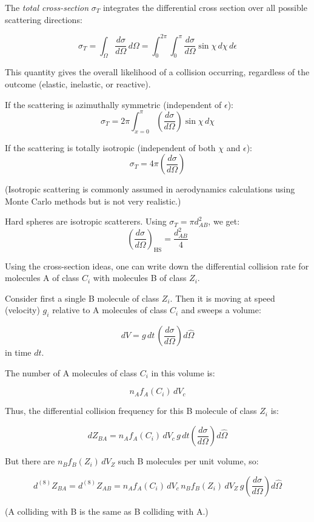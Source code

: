 \documentclass{article}
\begin{document}
The \emph{total cross-section} \( \sigma_T \) integrates the differential cross section over all possible scattering directions:

\[
\sigma_T = \int_{\Omega} \frac{d\sigma}{d\Omega} \, d\Omega = \int_0^{2\pi} \int_0^{\pi} \frac{d\sigma}{d\Omega} \sin \chi \, d\chi \, d\epsilon
\]

This quantity gives the overall likelihood of a collision occurring, regardless of the outcome (elastic, inelastic, or reactive).

If the scattering is azimuthally symmetric (independent of \( \epsilon \)):
\[
\sigma_T = 2\pi \int_{x=0}^{\pi} \left( \frac{d\sigma}{d\Omega} \right) \sin \chi \, d\chi
\]

If the scattering is totally isotropic (independent of both \( \chi \) and \( \epsilon \)):
\[
\sigma_T = 4\pi \left( \frac{d\sigma}{d\Omega} \right)
\]

(Isotropic scattering is commonly assumed in aerodynamics calculations using Monte Carlo methods but is not very realistic.)

Hard spheres are isotropic scatterers. Using \( \sigma_T = \pi d_{AB}^2 \), we get:
\[
\left( \frac{d\sigma}{d\Omega} \right)_{\text{HS}} = \frac{d_{AB}^2}{4}
\]

Using the cross-section ideas, one can write down the differential collision rate for molecules A of class \( C_i \) with molecules B of class \( Z_i \).

Consider first a single B molecule of class \( Z_i \). Then it is moving at speed (velocity) \( g_i \) relative to A molecules of class \( C_i \) and sweeps a volume:

\[
dV = g \, dt \, \left( \frac{d\sigma}{d\Omega} \right) d\hat{\Omega}
\]
in time \( dt \).

The number of A molecules of class \( C_i \) in this volume is:

\[
n_A f_A(C_i) \, dV_c
\]

Thus, the differential collision frequency for this B molecule of class \( Z_i \) is:

\[
dZ_{BA} = n_A f_A(C_i) \, dV_c \, g \, dt \left( \frac{d\sigma}{d\Omega} \right) d\hat{\Omega}
\]


But there are \( n_B f_B(Z_i) \, dV_Z \) such B molecules per unit volume, so:

\[
d^{(8)}Z_{BA} = d^{(8)}Z_{AB} = n_A f_A(C_i) \, dV_c \, n_B f_B(Z_i) \, dV_Z \, g \left( \frac{d\sigma}{d\Omega} \right) d\hat{\Omega}
\]

(A colliding with B is the same as B colliding with A.)
\end{document}
